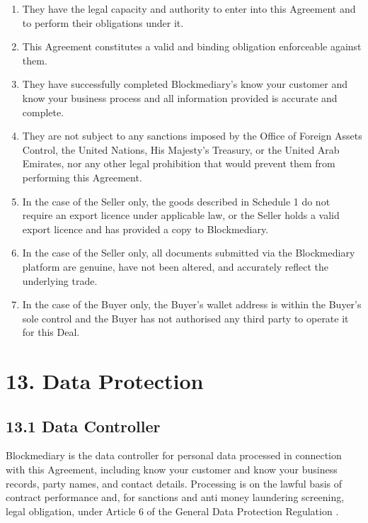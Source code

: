 \documentclass[12pt, a4paper]{article}
\begin{document}
\begin{enumerate}[label=(\alph*)]
\item They have the legal capacity and authority to enter into this Agreement and to
perform their obligations under it.
\item This Agreement constitutes a valid and binding obligation enforceable against them.
\item They have successfully completed Blockmediary's know your customer and know your
business process and all information provided is accurate and complete.
\item They are not subject to any sanctions imposed by the Office of Foreign Assets
Control, the United Nations, His Majesty's Treasury, or the United Arab Emirates, nor any
other legal prohibition that would prevent them from performing this Agreement.
\item In the case of the Seller only, the goods described in Schedule 1 do not require an
export licence under applicable law, or the Seller holds a valid export licence and has
provided a copy to Blockmediary.
\item In the case of the Seller only, all documents submitted via the Blockmediary
platform are genuine, have not been altered, and accurately reflect the underlying trade.
\item In the case of the Buyer only, the Buyer's wallet address is within the Buyer's sole
control and the Buyer has not authorised any third party to operate it for this Deal.
\end{enumerate}

\section*{13. Data Protection}

\subsection*{13.1 Data Controller}

Blockmediary is the data controller for personal data processed in connection with this
Agreement, including know your customer and know your business records, party names, and
contact details. Processing is on the lawful basis of contract performance and, for
sanctions and anti money laundering screening, legal obligation, under Article 6 of the
General Data Protection Regulation \citep{gdpr2016}.
\end{document}
